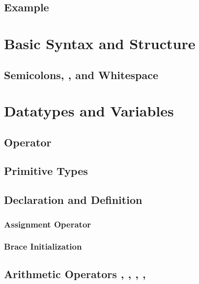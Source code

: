 \documentclass{article}
\begin{document}
\subsection{ Example}

\section{Basic Syntax and Structure}

\subsection{}

\subsection{Semicolons, , and Whitespace}

\section{Datatypes and Variables}

\subsection{ Operator}

\subsection{Primitive Types}

\subsection{Declaration and Definition}

\subsubsection{Assignment Operator \inlinecpp{=}}

\subsubsection{Brace Initialization \inlinecpp{\{\}}}

\subsection{Arithmetic Operators \inlinecpp{+}, \inlinecpp{-}, \inlinecpp{*}, \inlinecpp{/}, \inlinecpp{\%}}
\end{document}
